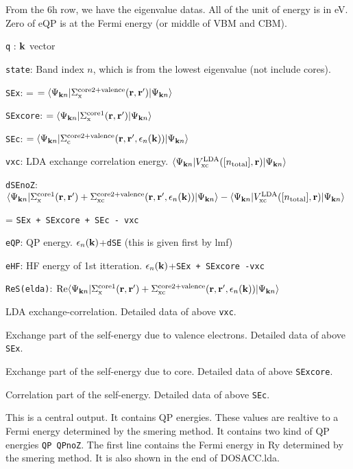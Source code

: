 \documentclass[a4paper,10pt,epsf,fleqn]{article}
\begin{document}
From the 6h row, we have the eigenvalue datas. All of the unit of energy is in eV.
Zero of eQP is at the Fermi energy (or middle of VBM and CBM).

{\tt q}  : ${\bf k}$ vector

{\tt state}: Band index $n$, which is from the lowest eigenvalue (not include cores).

{\tt SEx}: = $= \langle\Psi_{{\bf k}n}|\Sigma_{\rm x}^{\rm core2+valence}({\bf r},{\bf r}^{\prime})|\Psi_{{\bf k}n}\rangle$

{\tt SExcore}: $= \langle\Psi_{{\bf k}n}|\Sigma_{\rm x}^{\rm core1}({\bf r},{\bf r}^{\prime})|\Psi_{{\bf k}n}\rangle$

{\tt SEc}: $ = \langle\Psi_{{\bf k}n}|\Sigma_{\rm c}^{\rm core2+valence}({\bf r},{\bf r}^{\prime},\epsilon_n({\bf k}))|\Psi_{{\bf k}n}\rangle$

{\tt vxc}: LDA exchange correlation energy.
$\langle\Psi_{{\bf k}n}|V_{\rm xc}^{\rm LDA}([n_{\rm total}],{\bf r})|\Psi_{{\bf k}n}\rangle$

{\tt dSEnoZ}: $
\langle\Psi_{{\bf k}n}|
\Sigma_{\rm x}^{\rm core1}({\bf r},{\bf r}^{\prime})+
\Sigma_{\rm xc}^{\rm core2+valence}({\bf r},{\bf r}^{\prime},\epsilon_n({\bf k}))
|\Psi_{{\bf k}n}\rangle 
- \langle\Psi_{{\bf k}n}|V_{\rm xc}^{\rm LDA}([n_{\rm total}],{\bf r})|\Psi_{{\bf k}n}\rangle$

\hspace{1cm} = {\tt SEx + SExcore + SEc - vxc}

{\tt eQP}: QP energy.  $\epsilon_n({\bf k})$+{\tt dSE} (this is given first by lmf)

{\tt eHF}: HF energy of 1st itteration. $\epsilon_n({\bf k})$+{\tt SEx + SExcore -vxc}

{\tt ReS(elda)}:
${\rm Re}
\langle\Psi_{{\bf k}n}|
\Sigma_{\rm x}^{\rm core1}({\bf r},{\bf r}^{\prime})+
\Sigma_{\rm xc}^{\rm core2+valence}({\bf r},{\bf r}^{\prime},\epsilon_n({\bf k}))
|\Psi_{{\bf k}n}\rangle$ 

LDA exchange-correlation. 
Detailed data of above {\tt vxc}.

Exchange part of the self-energy due to valence electrons.
Detailed data of above {\tt SEx}.

Exchange part of the self-energy due to core.
Detailed data of above {\tt SExcore}.

Correlation part of the self-energy.
Detailed data of above {\tt SEc}.

This is a central output.
It contains QP energies. These values are 
realtive to a Fermi energy determined by the smering method.
It contains two kind of QP energies {\tt QP QPnoZ}.
The first line contains the Fermi energy in Ry determined by the smering method.
It is also shown in the end of {\sf DOSACC.lda}.
\end{document}
